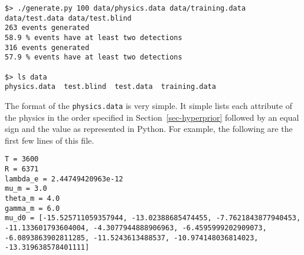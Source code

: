 \documentclass[12pt,letterpaper,onecolumn,oneside]{article}
\begin{document}
\begin{appendices}
\begin{lstlisting}
$> ./generate.py 100 data/physics.data data/training.data data/test.data data/test.blind
263 events generated
58.9 % events have at least two detections
316 events generated
57.9 % events have at least two detections

$> ls data
physics.data  test.blind  test.data  training.data
\end{lstlisting}
The format of the {\tt physics.data} is very simple. It simple lists
each attribute of the physics in the order specified in
Section~\ref{sec-hyperprior} followed by an equal sign and the value as
represented in Python. For example, the following are the first few
lines of this file.
\begin{lstlisting}
T = 3600
R = 6371
lambda_e = 2.44749420963e-12
mu_m = 3.0
theta_m = 4.0
gamma_m = 6.0
mu_d0 = [-15.525711059357944, -13.02388685474455, -7.7621843877940453, -11.133601793604004, -4.3077944888906963, -6.4595999202909073, -6.0893863902811285, -11.5243613488537, -10.974148036814023, -13.319638578401111]
\end{lstlisting}


\end{appendices}
\end{document}
